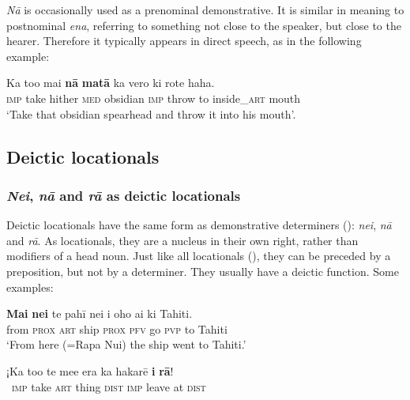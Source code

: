 \textit{Nā} is occasionally used as a prenominal demonstrative. It is similar in meaning to postnominal \textit{ena}, referring to something not close to the speaker, but close to the hearer. Therefore it typically appears in direct speech, as in the following example:

\ea\label{ex:4.225}
\gll Ka to{\ꞌ}o mai \textbf{nā} \textbf{matā} ka vero ki rote haha. \\
\textsc{imp} take hither \textsc{med} obsidian \textsc{imp} throw to inside\_\textsc{art} mouth \\

\glt 
‘Take that obsidian spearhead and throw it into his mouth’. \textstyleExampleref{[R304.020]} 
\z
{}
\subsection{Deictic locationals}\label{sec:4.6.5}
\subsubsection{\textit{Nei}, \textit{nā} and \textit{rā} as deictic locationals}\label{sec:4.6.5.1}

Deictic locationals have the same form as demonstrative determiners (): \textit{nei}, \textit{nā} and \textit{rā}. As locationals, they are a nucleus in their own right, rather than modifiers of a head noun. Just like all locationals (), they can be preceded by a preposition, but not by a determiner. They usually have a deictic function. Some examples:

\ea\label{ex:4.226}
\gll \textbf{Mai} \textbf{nei} te pahī nei i oho ai ki Tahiti. \\
from \textsc{prox} \textsc{art} ship \textsc{prox} \textsc{pfv} go \textsc{pvp} to Tahiti \\

\glt 
‘From here (=Rapa Nui) the ship went to Tahiti.’ \textstyleExampleref{[R239.091]} 
\z

\ea\label{ex:4.227}
\gll ¡Ka to{\ꞌ}o te me{\ꞌ}e era ka hakarē \textbf{{\ꞌ}i} \textbf{rā}! \\
~\textsc{imp} take \textsc{art} thing \textsc{dist} \textsc{imp} leave at \textsc{dist} \\

